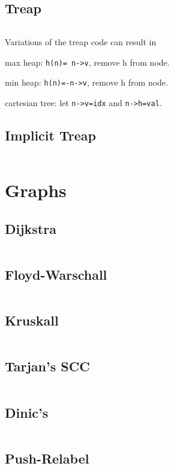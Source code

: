 \documentclass[11pt, a4paper]{amsart}
\newenvironment{itemize_compact}
{ \begin{itemize}[leftmargin=.5cm]
    \setlength{\itemsep}{0pt}
    \setlength{\parskip}{0pt}
    \setlength{\parsep}{0pt}     }
{ \end{itemize}                  }
\begin{document}
	\begin{multicols*}{2}
		\subsection{Treap}
		\inputminted[firstline=3,lastline=51]{c++}{.code/datastructures/treap.cpp}
		\noindent
		Variations of the treap code can result in
		\begin{itemize_compact}
			\item max heap: \texttt{h(n)= n->v}, remove h from node.
			\item min heap: \texttt{h(n)=-n->v}, remove h from node.
			\item cartesian tree: let \texttt{n->v=idx} and \texttt{n->h=val}.
		\end{itemize_compact}
		\vfill\null
		\columnbreak
		\subsection{Implicit Treap}
		\inputminted[firstline=3,lastline=43]{c++}{.code/datastructures/implicit_treap.cpp}
		\vfill\null
	\end{multicols*}
	\section{Graphs}
	\begin{multicols*}{2}
		\subsection{Dijkstra}
		\inputminted[firstline=3,lastline=10]{c++}{.code/graphs/dijkstra.cpp}
		\subsection{Floyd-Warschall}
		\inputminted[firstline=3,lastline=6]{c++}{.code/graphs/floyd_warschall.cpp}
		\subsection{Kruskall}
		\inputminted[firstline=3,lastline=9]{c++}{.code/graphs/kruskall.cpp}
		\subsection{Tarjan's SCC}
		\inputminted[firstline=3,lastline=10]{c++}{.code/graphs/scc.cpp}
		\vfill\null
		\columnbreak
		\subsection{Dinic's}
		\inputminted[firstline=3,lastline=18]{c++}{.code/graphs/dinic.cpp}
		\subsection{Push-Relabel}
		\inputminted[firstline=3,lastline=14]{c++}{.code/graphs/pushrelabel.cpp}
		\vfill\null
	\end{multicols*}
	\newpage
\end{document}
